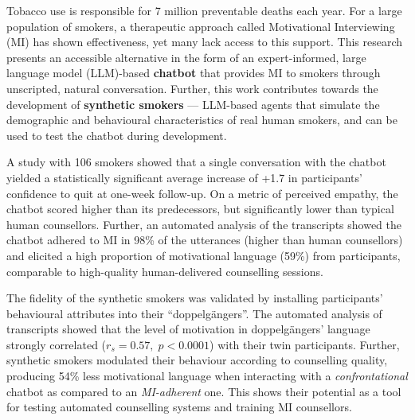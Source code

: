 Tobacco use is responsible for 7 million preventable deaths each year. For a large population of smokers, a therapeutic approach called Motivational Interviewing (MI) has shown effectiveness, yet many lack access to this support. This research presents an accessible alternative in the form of an expert-informed, large language model (LLM)-based \textbf{chatbot} that provides MI to smokers through unscripted, natural conversation. Further, this work contributes towards the development of \textbf{synthetic smokers} ---  LLM-based agents that simulate the demographic and behavioural characteristics of real human smokers, and can be used to test the chatbot during development.

A study with 106 smokers showed that a single conversation with the chatbot yielded a statistically significant average increase of +1.7 in participants' confidence to quit at one-week follow-up. On a metric of perceived empathy, the chatbot scored higher than its predecessors, but significantly lower than typical human counsellors. Further, an automated analysis of the transcripts showed the chatbot adhered to MI in 98\% of the utterances (higher than human counsellors) and elicited a high proportion of motivational language (59\%) from participants, comparable to high-quality human-delivered counselling sessions.

The fidelity of the synthetic smokers was validated by installing participants' behavioural attributes into their ``doppelgängers''. The automated analysis of transcripts showed that the level of motivation in doppelgängers' language strongly correlated ($r_s=0.57,
\; p < 0.0001$) with their twin participants. Further, synthetic smokers modulated their behaviour according to counselling quality, producing 54\% less motivational language when interacting with a \emph{confrontational} chatbot as compared to an \emph{MI-adherent} one. This shows their potential as a tool for testing automated counselling systems and training MI counsellors.